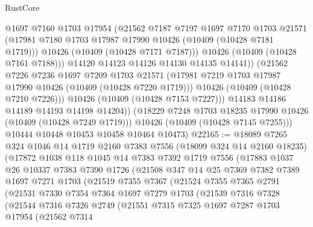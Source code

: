 \begin{lexlean}{RustCore}
\begin{coremodule}
                    @1697
                    @7160
                    @1703
                    @17954
                    (@21562
                      @7187
                      @7197
                      @1697
                      @7170
                      @1703
                      @21571
                      (@17981 @7180 @1703 @17987 @17990 @10426 (@10409 (@10428 @7181 @1719)))
                      @10426
                      (@10409 (@10428 @7171 @7187)))
                    @10426
                    (@10409 (@10428 @7161 @7188)))
                  @14120
                  @14123
                  @14126
                  @14130
                  @14135
                  @14141))
              (@21562
                @7226
                @7236
                @1697
                @7209
                @1703
                @21571
                (@17981 @7219 @1703 @17987 @17990 @10426 (@10409 (@10428 @7220 @1719)))
                @10426
                (@10409 (@10428 @7210 @7226)))
              @10426
              (@10409 (@10428 @7153 @7227)))
            @14183
            @14186
            @14189
            @14193
            @14198
            @14204))
        (@18229 @7248 @1703 @18235 @17990 @10426 (@10409 (@10428 @7249 @1719)))
        @10426
        (@10409 (@10428 @7145 @7255)))
      @10444
      @10448
      @10453
      @10458
      @10464
      @10473)
@22165 := @18089
    @7265
    @324
    @1046
    @14
    @1719
    @2160
    @7383
    @7556
    (@18099 @324 @14 @2160 @18235)
    (@17872
      @1038
      @118
      @1045
      @14
      @7383
      @7392
      @1719
      @7556
      (@17883
        @1037
        @26
        @10337
        @7383
        @7390
        @1726
        (@21508
          @347
          @14
          @25
          @7369
          @7382
          @7389
          @1697
          @7271
          @1703
          (@21519
            @7355
            @7367
            (@21524
              @7355
              @7365
              @2791
              (@21531
                @7330
                @7354
                @7364
                @1697
                @7279
                @1703
                (@21539
                  @7316
                  @7328
                  (@21544
                    @7316
                    @7326
                    @2749
                    (@21551
                      @7315
                      @7325
                      @1697
                      @7287
                      @1703
                      @17954
                      (@21562
                        @7314

\end{coremodule}
\end{lexlean}
